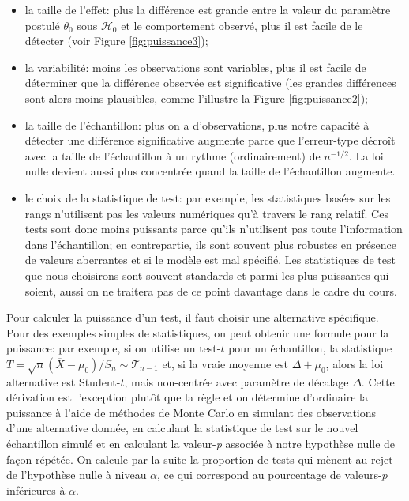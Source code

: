 \documentclass[
  11pt,
  letterpaper,
]{article}
\providecommand{\tightlist}{%
  \setlength{\itemsep}{0pt}\setlength{\parskip}{0pt}}
\theoremstyle{definition}
\theoremstyle{definition}
\theoremstyle{definition}
\theoremstyle{remark}
\begin{document}
\begin{itemize}
\tightlist
\item
  la taille de l'effet: plus la différence est grande entre la valeur du paramètre postulé \(\theta_0\) sous \(\mathscr{H}_0\) et le comportement observé, plus il est facile de le détecter (voir Figure \ref{fig:puissance3});
\item
  la variabilité: moins les observations sont variables, plus il est facile de déterminer que la différence observée est significative (les grandes différences sont alors moins plausibles, comme l'illustre la Figure \ref{fig:puissance2});
\item
  la taille de l'échantillon: plus on a d'observations, plus notre capacité à détecter une différence significative augmente parce que l'erreur-type décroît avec la taille de l'échantillon à un rythme (ordinairement) de \(n^{-1/2}\). La loi nulle devient aussi plus concentrée quand la taille de l'échantillon augmente.
\item
  le choix de la statistique de test: par exemple, les statistiques basées sur les rangs n'utilisent pas les valeurs numériques qu'à travers le rang relatif. Ces tests sont donc moins puissants parce qu'ils n'utilisent pas toute l'information dans l'échantillon; en contrepartie, ils sont souvent plus robustes en présence de valeurs aberrantes et si le modèle est mal spécifié. Les statistiques de test que nous choisirons sont souvent standards et parmi les plus puissantes qui soient, aussi on ne traitera pas de ce point davantage dans le cadre du cours.
\end{itemize}

Pour calculer la puissance d'un test, il faut choisir une alternative spécifique. Pour des exemples simples de statistiques, on peut obtenir une formule pour la puissance: par exemple, si on utilise un test-\(t\) pour un échantillon, la statistique \(T=\sqrt{n}(\overline{X}-\mu_0)/S_n \sim \mathcal{T}_{n-1}\) et, si la vraie moyenne est \(\Delta + \mu_0\), alors la loi alternative est Student-\(t\), mais non-centrée avec paramètre de décalage \(\Delta\). Cette dérivation est l'exception plutôt que la règle et on détermine d'ordinaire la puissance à l'aide de méthodes de Monte Carlo en simulant des observations d'une alternative donnée, en calculant la statistique de test sur le nouvel échantillon simulé et en calculant la valeur-\emph{p} associée à notre hypothèse nulle de façon répétée. On calcule par la suite la proportion de tests qui mènent au rejet de l'hypothèse nulle à niveau \(\alpha\), ce qui correspond au pourcentage de valeurs-\(p\) inférieures à \(\alpha\).
\end{document}
